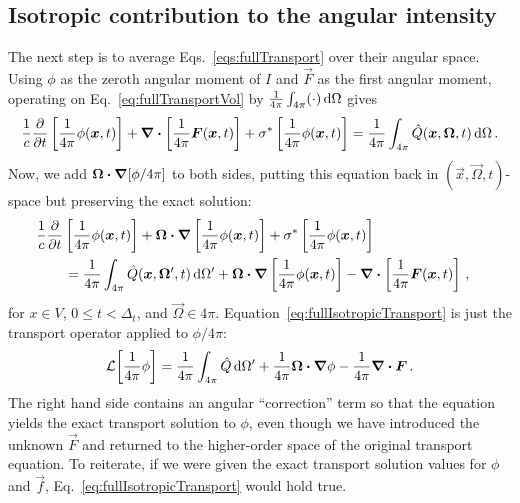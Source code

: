 \subsection{Isotropic contribution to the angular intensity}
The next step is to average Eqs.~\eqref{eqs:fullTransport} over their angular
space. Using $\phi$ as the zeroth angular moment of $I$ and
$\vec{F}$ as the first angular moment, operating on
Eq.~\eqref{eq:fullTransportVol} by $ \frac{1}{4\pi} \int_{4\pi} (\cdot) \mathop{}\!\mathrm{d}
\Omega$ gives
\begin{equation*}
\frac{1}{c} \frac{\partial }{\partial t}\left[ \frac1{4\pi} \phi(\bm{x}, t) \right]
  + \bm{\nabla} \bm{\cdot} \left[ \frac1{4\pi} \bm{F}(\bm{x}, t) \right]
  + \sigma^\ast \left[ \frac1{4\pi} \phi(\bm{x}, t) \right]
  =
  \frac{1}{4\pi} \int_{4\pi} \hat Q(\bm{x}, \bm{\Omega}, t) \mathop{}\!\mathrm{d} \Omega\,.
\end{equation*}
Now, we add $\bm{\Omega}\bm{\cdot} \bm{\nabla} [\phi/4\pi]$ to both sides, putting this
equation back in $(\vec{x}, \vec{\Omega}, t)$-space but preserving the exact
solution:
\begin{align} \label{eq:fullIsotropicTransport}
 \begin{split}
  \lefteqn{\frac{1}{c} \pder{}{t}\left[ \frac1{4\pi} \phi(\vec{x}, t) \right]
  + \vec{\Omega}\vd \grad  \left[ \frac1{4\pi} \phi(\vec{x}, t) \right]
  + \sigma^\ast \left[ \frac1{4\pi} \phi(\vec{x}, t) \right]}\qquad
  \\
  &= \frac{1}{4\pi} \int_{4\pi} \hat Q(\vec{x}, \vec{\Omega}', t) \ud \Omega'
  + \vec{\Omega}\vd \grad  \left[ \frac1{4\pi} \phi(\vec{x}, t) \right]
  - \grad \vd \left[ \frac1{4\pi} \vec{F}(\vec{x}, t) \right]
\,,
 \end{split}
\end{align}
for $x \in V$, $0 \le t < \Delta_t$, and $\vec{\Omega} \in 4\pi$.
Equation~\eqref{eq:fullIsotropicTransport} is just the
transport operator applied to $\phi/4\pi$:
\begin{equation*}
  \mathcal{L}\!\left[\frac1{4\pi} \phi\right] = \frac{1}{4\pi} \int_{4\pi} \hat Q \mathop{}\!\mathrm{d} \Omega'
  + \frac1{4\pi}\bm{\Omega}\bm{\cdot} \bm{\nabla} \phi
  - \frac1{4\pi}\bm{\nabla} \bm{\cdot} \bm{F}\,.
\end{equation*}
The right hand side contains an
angular ``correction'' term so that the equation yields the exact transport
solution to $\phi$, even though we have introduced the unknown $\vec{F}$ and
returned to the higher-order space of the original transport equation. To
reiterate, if we were given the exact transport solution values for $\phi$ and
$\vec{f}$, Eq.~\eqref{eq:fullIsotropicTransport} would hold true.

